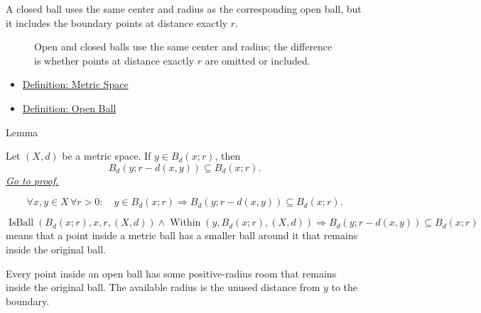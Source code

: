 \begin{remark*}[Interpretation]
A closed ball uses the same center and radius as the corresponding open ball,
but it includes the boundary points at distance exactly \(r\).
\end{remark*}

\begin{figure}[htbp]
\centering

\caption{Open and closed balls use the same center and radius; the difference
is whether points at distance exactly \(r\) are omitted or included.}
\label{fig:open-closed-balls}
\end{figure}

\begin{dependencies}
\begin{itemize}
  \item \hyperref[def:metric-space]{Definition: Metric Space}
  \item \hyperref[def:metric-open-ball]{Definition: Open Ball}
\end{itemize}
\end{dependencies}

\begin{lemmabox}{Lemma}
\begin{lemma}\label{lem:metric-key-local-ball}
Let \((X,d)\) be a metric space.  If \(y\in B_d(x;r)\), then
\[
  B_d(y;r-d(x,y))\subseteq B_d(x;r).
\]
\hyperref[prf:metric-key-local-ball]{\textit{Go to proof.}}
\end{lemma}
\end{lemmabox}


\begin{remark*}
\[
\forall x,y\in X\,\forall r>0{:}\quad
y\in B_d(x;r)
\Longrightarrow
B_d(y;r-d(x,y))\subseteq B_d(x;r).
\]
\end{remark*}

\begin{remark*}
\[
\operatorname{IsBall}(B_d(x;r),x,r,(X,d))
\land
\operatorname{Within}(y,B_d(x;r),(X,d))
\Longrightarrow
B_d(y;r-d(x,y))\subseteq B_d(x;r)
\]
means that a point inside a metric ball has a smaller ball around it that
remains inside the original ball.
\end{remark*}

\begin{remark*}[Interpretation]
Every point inside an open ball has some positive-radius room that remains
inside the original ball.  The available radius is the unused distance from
\(y\) to the boundary.
\end{remark*}

